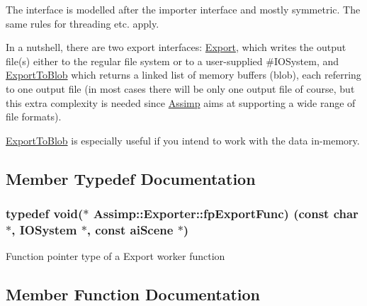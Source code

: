 The interface is modelled after the importer interface and mostly symmetric. The same rules for threading etc. apply.

In a nutshell, there are two export interfaces\+: \hyperlink{class_assimp_1_1_exporter_ab8edf249172567a78ca302278a415e35}{Export}, which writes the output file(s) either to the regular file system or to a user-\/supplied \#\+I\+O\+System, and \hyperlink{class_assimp_1_1_exporter_a390c0950a3a164fc431e0797ae1a84d1}{Export\+To\+Blob} which returns a linked list of memory buffers (blob), each referring to one output file (in most cases there will be only one output file of course, but this extra complexity is needed since \hyperlink{namespace_assimp}{Assimp} aims at supporting a wide range of file formats).

\hyperlink{class_assimp_1_1_exporter_a390c0950a3a164fc431e0797ae1a84d1}{Export\+To\+Blob} is especially useful if you intend to work with the data in-\/memory. 

\subsection{Member Typedef Documentation}
\subsubsection[{\texorpdfstring{fp\+Export\+Func}{fpExportFunc}}]{\setlength{\rightskip}{0pt plus 5cm}typedef void($\ast$ Assimp\+::\+Exporter\+::fp\+Export\+Func) (const char $\ast$, {\bf I\+O\+System} $\ast$, const ai\+Scene $\ast$)}\hypertarget{class_assimp_1_1_exporter_a6641de13026c5ce4a05ead71a8097204}{}\label{class_assimp_1_1_exporter_a6641de13026c5ce4a05ead71a8097204}
Function pointer type of a Export worker function 

\subsection{Member Function Documentation}
